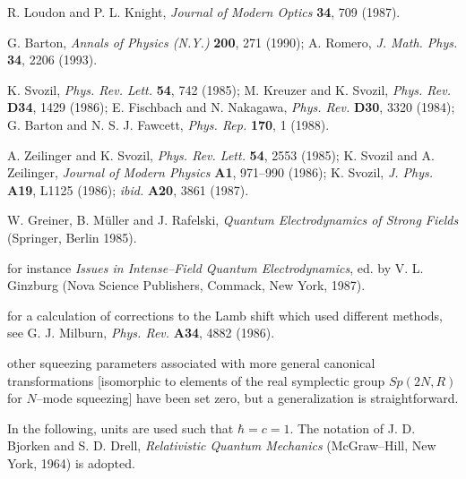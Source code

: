 \begin{thebibliography}{99}


R. Loudon and P. L. Knight, {\sl Journal of Modern Optics} {\bf 34}, 709
(1987).


G. Barton, {\sl Annals of
Physics (N.Y.)} {\bf 200}, 271 (1990);
A. Romero, {\sl J. Math. Phys.} {\bf 34}, 2206 (1993).

K. Svozil, {\sl Phys. Rev. Lett.} {\bf 54}, 742 (1985);
M. Kreuzer and K. Svozil, {\sl Phys. Rev.} {\bf D34}, 1429 (1986);
E. Fischbach and N. Nakagawa, {\sl Phys. Rev.} {\bf D30}, 3320 (1984);
G. Barton and N. S. J. Fawcett, {\sl Phys. Rep.} {\bf 170}, 1 (1988).

 A. Zeilinger and K. Svozil,
{\sl Phys. Rev. Lett.} {\bf 54}, 2553 (1985);
K. Svozil and A. Zeilinger,
{\sl Journal of Modern Physics} {\bf A1}, 971--990 (1986);
K. Svozil,
{\sl J. Phys.} {\bf A19}, L1125 (1986);
{\sl ibid.} {\bf A20}, 3861 (1987).

W. Greiner, B. M\"uller and J. Rafelski, {\sl Quantum Electrodynamics of
Strong Fields} (Springer, Berlin 1985).

 for instance {\sl Issues in Intense--Field Quantum Electrodynamics},
ed. by V. L. Ginzburg (Nova Science Publishers, Commack, New York,
1987).

 for a calculation of corrections to the Lamb shift which used
 different methods, see G. J. Milburn, {\sl Phys. Rev. } {\bf A34},
 4882 (1986).


 other squeezing parameters associated with more general canonical
 transformations [isomorphic to elements of the real symplectic
 group $Sp(2N,R)$ for $N$--mode squeezing]
 have been set zero, but a generalization is
 straightforward.

In the following, units are used such that $\hbar = c =1 $. The notation
of J. D. Bjorken and S. D. Drell, {\sl Relativistic Quantum Mechanics}
(McGraw--Hill, New York, 1964) is adopted.

\end{thebibliography}

